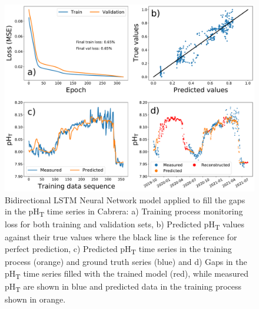 \begin{figure}[H]
    \centering

    \includegraphics[width=\textwidth]{Figures/bidirectional_LSTM_gap_filling.pdf}
    \caption[Deep learning model applied to fill the
        gaps in the pH\textsubscript{T} time series in Cabrera]{Bidirectional
        LSTM
        Neural Network model applied to fill the
        gaps in the pH\textsubscript{T} time series in Cabrera: a) Training
        process
        monitoring loss for both training and validation sets, b) Predicted
        pH\textsubscript{T} values against their true values where the black
        line is
        the reference for perfect prediction, c) Predicted pH\textsubscript{T}
        time
        series in the training process (orange) and ground truth series (blue)
        and d)
        Gaps in the pH\textsubscript{T} time series filled with the trained
        model
        (red), while measured pH\textsubscript{T} are shown in blue and
        predicted data
        in the training process shown in orange.}
    \label{fig:Cabrera_gap_filling}
\end{figure}

